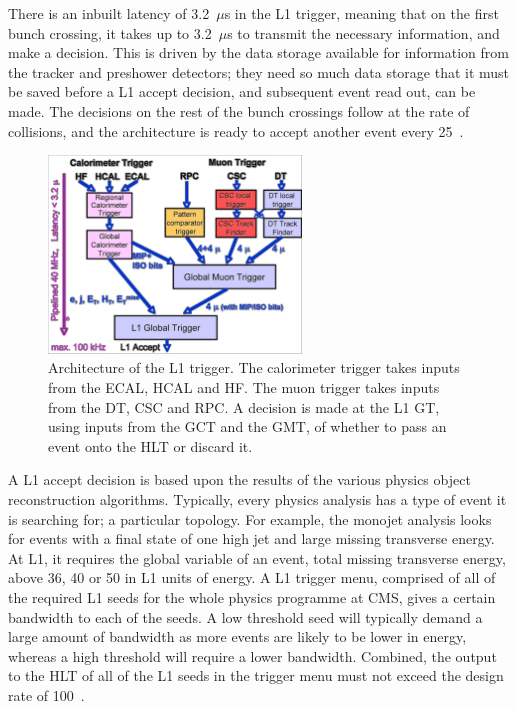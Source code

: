 There is an inbuilt latency of 3.2~$\mu$s in the \ac{L1} trigger, meaning that on the first bunch crossing, it takes up to 3.2~$\mu$s to transmit the necessary information, and make a decision. 
This is driven by the data storage available for information from the tracker and preshower detectors; 
they need so much data storage that it must be saved before a L1 accept decision, and subsequent event read out, can be made.
The decisions on the rest of the bunch crossings follow at the rate of collisions, and the architecture is ready to accept another event every 25~\ns.


\begin{figure}[htbp]
  \begin{center}
  \includegraphics[width=0.6\textwidth]{Figures/detector/L1TriggerArch.pdf}
  \caption{Architecture of the \ac{L1} trigger. The calorimeter trigger takes inputs from the \ac{ECAL}, \ac{HCAL} and \ac{HF}. The muon trigger takes inputs from the \ac{DT}, \ac{CSC} and \ac{RPC}. A decision is made at the L1 \ac{GT}, using inputs from the \ac{GCT} and the \ac{GMT}, of whether to pass an event onto the \ac{HLT} or discard it.
}
  \label{fig:L1triggerArch}
  \end{center}
\end{figure}

A \ac{L1} accept decision is based upon the results of the various physics object reconstruction algorithms.
Typically, every physics analysis has a type of event it is searching for; a particular topology. 
For example, the monojet analysis looks for events with a final state of one high \pt jet and large missing transverse energy. 
At L1, it requires the global variable of an event, total missing transverse energy, above 36, 40 or 50 in \ac{L1} units of energy.
A L1 trigger menu, comprised of all of the required L1 seeds for the whole physics programme at \ac{CMS}, gives a certain bandwidth to each of the seeds. A low threshold seed will typically demand a large amount of bandwidth as more events are likely to be lower in energy, whereas a high threshold will require a lower bandwidth. 
Combined, the output to the \ac{HLT} of all of the L1 seeds in the trigger menu must not exceed the design rate of 100~\kHz.%


